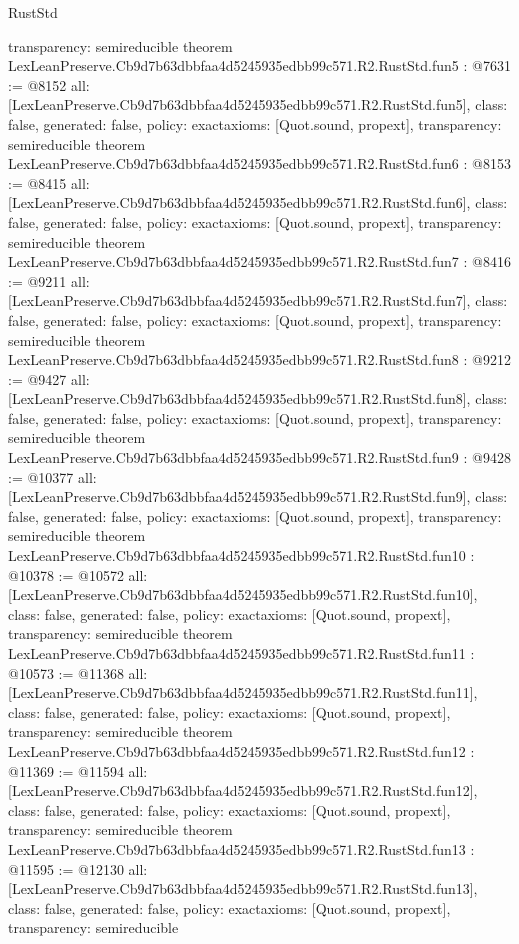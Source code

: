 \begin{lexlean}{RustStd}
\begin{coremodule}
{  transparency: semireducible
}
theorem LexLeanPreserve.Cb9d7b63dbbfaa4d5245935edbb99c571.R2.RustStd.fun5 : @7631 := @8152 {
  all: [LexLeanPreserve.Cb9d7b63dbbfaa4d5245935edbb99c571.R2.RustStd.fun5],
  class: false,
  generated: false,
  policy: exact{axioms: [Quot.sound, propext]},
  transparency: semireducible
}
theorem LexLeanPreserve.Cb9d7b63dbbfaa4d5245935edbb99c571.R2.RustStd.fun6 : @8153 := @8415 {
  all: [LexLeanPreserve.Cb9d7b63dbbfaa4d5245935edbb99c571.R2.RustStd.fun6],
  class: false,
  generated: false,
  policy: exact{axioms: [Quot.sound, propext]},
  transparency: semireducible
}
theorem LexLeanPreserve.Cb9d7b63dbbfaa4d5245935edbb99c571.R2.RustStd.fun7 : @8416 := @9211 {
  all: [LexLeanPreserve.Cb9d7b63dbbfaa4d5245935edbb99c571.R2.RustStd.fun7],
  class: false,
  generated: false,
  policy: exact{axioms: [Quot.sound, propext]},
  transparency: semireducible
}
theorem LexLeanPreserve.Cb9d7b63dbbfaa4d5245935edbb99c571.R2.RustStd.fun8 : @9212 := @9427 {
  all: [LexLeanPreserve.Cb9d7b63dbbfaa4d5245935edbb99c571.R2.RustStd.fun8],
  class: false,
  generated: false,
  policy: exact{axioms: [Quot.sound, propext]},
  transparency: semireducible
}
theorem LexLeanPreserve.Cb9d7b63dbbfaa4d5245935edbb99c571.R2.RustStd.fun9 : @9428 := @10377 {
  all: [LexLeanPreserve.Cb9d7b63dbbfaa4d5245935edbb99c571.R2.RustStd.fun9],
  class: false,
  generated: false,
  policy: exact{axioms: [Quot.sound, propext]},
  transparency: semireducible
}
theorem LexLeanPreserve.Cb9d7b63dbbfaa4d5245935edbb99c571.R2.RustStd.fun10 : @10378 := @10572 {
  all: [LexLeanPreserve.Cb9d7b63dbbfaa4d5245935edbb99c571.R2.RustStd.fun10],
  class: false,
  generated: false,
  policy: exact{axioms: [Quot.sound, propext]},
  transparency: semireducible
}
theorem LexLeanPreserve.Cb9d7b63dbbfaa4d5245935edbb99c571.R2.RustStd.fun11 : @10573 := @11368 {
  all: [LexLeanPreserve.Cb9d7b63dbbfaa4d5245935edbb99c571.R2.RustStd.fun11],
  class: false,
  generated: false,
  policy: exact{axioms: [Quot.sound, propext]},
  transparency: semireducible
}
theorem LexLeanPreserve.Cb9d7b63dbbfaa4d5245935edbb99c571.R2.RustStd.fun12 : @11369 := @11594 {
  all: [LexLeanPreserve.Cb9d7b63dbbfaa4d5245935edbb99c571.R2.RustStd.fun12],
  class: false,
  generated: false,
  policy: exact{axioms: [Quot.sound, propext]},
  transparency: semireducible
}
theorem LexLeanPreserve.Cb9d7b63dbbfaa4d5245935edbb99c571.R2.RustStd.fun13 : @11595 := @12130 {
  all: [LexLeanPreserve.Cb9d7b63dbbfaa4d5245935edbb99c571.R2.RustStd.fun13],
  class: false,
  generated: false,
  policy: exact{axioms: [Quot.sound, propext]},
  transparency: semireducible
}
\end{coremodule}
\end{lexlean}

